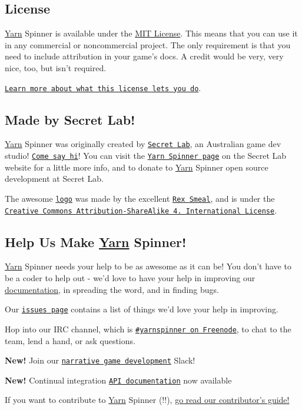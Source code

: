\subsection*{License}

\hyperlink{a00026}{Yarn} Spinner is available under the \hyperlink{a00016}{M\-I\-T License}. This means that you can use it in any commercial or noncommercial project. The only requirement is that you need to include attribution in your game's docs. A credit would be very, very nice, too, but isn't required.


\begin{DoxyItemize}
\item \href{https://tldrlegal.com/license/mit-license}{\tt Learn more about what this license lets you do}.
\end{DoxyItemize}

\subsection*{Made by Secret Lab!}

\hyperlink{a00026}{Yarn} Spinner was originally created by \href{http://secretlab.com.au}{\tt Secret Lab}, an Australian game dev studio! \href{https://twitter.com/thesecretlab}{\tt Come say hi}! You can visit the \href{http://www.secretlab.com.au/yarnspinner}{\tt Yarn Spinner page} on the Secret Lab website for a little more info, and to donate to \hyperlink{a00026}{Yarn} Spinner open source development at Secret Lab.

The awesome \href{Documentation/YarnSpinnerLogo.png}{\tt logo} was made by the excellent \href{https://twitter.com/RexSmeal}{\tt Rex Smeal}, and is under the \href{http://creativecommons.org/licenses/by-sa/4.0/}{\tt Creative Commons Attribution-\/\-Share\-Alike 4. International License}.

\subsection*{Help Us Make \hyperlink{a00026}{Yarn} Spinner!}

\hyperlink{a00026}{Yarn} Spinner needs your help to be as awesome as it can be! You don't have to be a coder to help out -\/ we'd love to have your help in improving our \hyperlink{a00012}{documentation}, in spreading the word, and in finding bugs.


\begin{DoxyItemize}
\item Our \href{https://github.com/thesecretlab/YarnSpinner/issues}{\tt issues page} contains a list of things we'd love your help in improving.
\item Hop into our I\-R\-C channel, which is \href{https://webchat.freenode.net/?channels=yarnspinner}{\tt \#yarnspinner on Freenode}, to chat to the team, lend a hand, or ask questions.
\item {\bfseries New!} Join our \href{http://lab.to/narrativegamedev}{\tt narrative game development} Slack!
\item {\bfseries New!} Continual integration \href{https://thesecretlab.github.io/YarnSpinner/html/}{\tt A\-P\-I documentation} now available
\end{DoxyItemize}

If you want to contribute to \hyperlink{a00026}{Yarn} Spinner (!!), \hyperlink{a00002}{go read our contributor's guide!} 